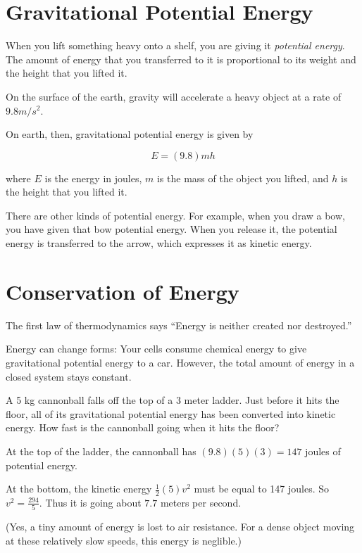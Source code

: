\section{Gravitational Potential Energy}

When you lift something heavy onto a shelf, you are giving it
\textit{potential energy}. The amount of energy that you transferred
to it is proportional to its weight and the height that you lifted it.

On the surface of the earth, gravity will accelerate a heavy object at
a rate of $9.8 m/s^2$.

\begin{mdframed}[style=important, frametitle={Formula for Gravitational Potential Energy}]
On earth, then, gravitational potential energy is given by

$$E = (9.8)mh$$


where $E$ is the energy in joules, $m$ is the mass of the object you
lifted, and $h$ is the height that you lifted it.

\end{mdframed}


There are other kinds of potential energy. For example, when you draw
a bow, you have given that bow potential energy. When you release it,
the potential energy is transferred to the arrow, which expresses it
as kinetic energy.

\section{Conservation of Energy}

The first law of thermodynamics says ``Energy is neither created nor
destroyed.''

Energy can change forms: Your cells consume chemical energy to give
gravitational potential energy to a car.  However, the total amount of
energy in a closed system stays constant.

\begin{Exercise}[title={The Energy of Falling}, label=energy_falling]
  
A 5 kg cannonball falls off the top of a 3 meter ladder. Just before
it hits the floor, all of its gravitational potential energy has been
converted into kinetic energy.  How fast is the cannonball going when
it hits the floor?

\end{Exercise}
\begin{Answer}[ref=energy_falling]

  At the top of the ladder, the cannonball has $(9.8)(5)(3) = 147$ joules of potential energy.

  At the bottom, the kinetic energy $\frac{1}{2}(5)v^2$ must be equal
  to 147 joules. So $v^2 = \frac{294}{5}$.  Thus it is going about
  $7.7$ meters per second.

  (Yes, a tiny amount of energy is lost to air resistance. For a dense
  object moving at these relatively slow speeds, this energy is
  neglible.)
  
\end{Answer}


